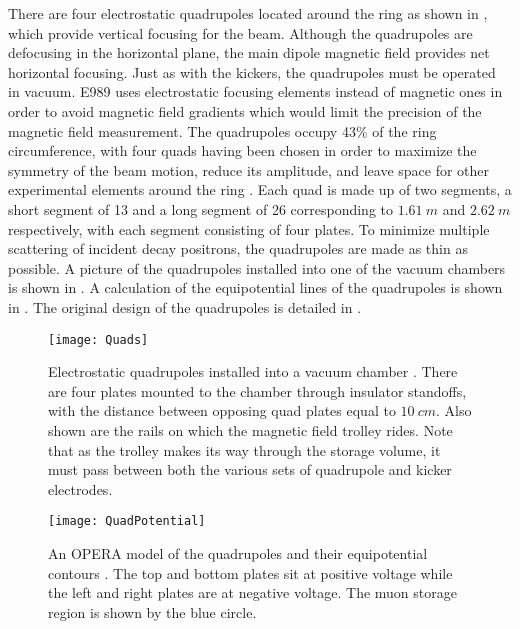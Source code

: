 There are four electrostatic quadrupoles located around the ring as shown in , which provide vertical focusing for the beam. Although the quadrupoles are defocusing in the horizontal plane, the main dipole magnetic field provides net horizontal focusing. Just as with the kickers, the quadrupoles must be operated in vacuum. E989 uses electrostatic focusing elements instead of magnetic ones in order to avoid magnetic field gradients which would limit the precision of the magnetic field measurement. The quadrupoles occupy 43\% of the ring circumference, with four quads having been chosen in order to maximize the symmetry of the beam motion, reduce its amplitude, and leave space for other experimental elements around the ring \cite{TDR}. Each quad is made up of two segments, a short segment of 13\textdegree{} and a long segment of 26\textdegree{} corresponding to $\SI{1.61}{m}$ and $\SI{2.62}{m}$ respectively, with each segment consisting of four plates. To minimize multiple scattering of incident decay positrons, the quadrupoles are made as thin as possible. A picture of the quadrupoles installed into one of the vacuum chambers is shown in . A calculation of the equipotential lines of the quadrupoles is shown in . The original design of the quadrupoles is detailed in .

\begin{figure}[]
    \centering
    \texttt{[image: Quads]}
    \caption[Electrostatic quadrupoles installed in a vacuum chamber]{Electrostatic quadrupoles installed into a vacuum chamber \cite{QuadsE821}. There are four plates mounted to the chamber through insulator standoffs, with the distance between opposing quad plates equal to $\SI{10}{cm}$. Also shown are the rails on which the magnetic field trolley rides. Note that as the trolley makes its way through the storage volume, it must pass between both the various sets of quadrupole and kicker electrodes.}
    \label{fig:Quads}
\end{figure}

\begin{figure}[]
    \centering
    \texttt{[image: QuadPotential]}
    \caption[Electrostatic quadrupole potentials]{An OPERA model of the quadrupoles and their equipotential contours \cite{TDR}. The top and bottom plates sit at positive voltage while the left and right plates are at negative voltage. The muon storage region is shown by the blue circle.}   
    \label{fig:QuadPotential}
\end{figure}


